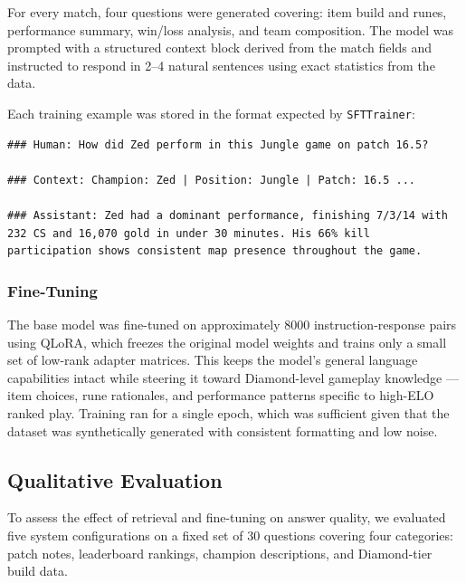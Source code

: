 \documentclass[fleqn,moreauthors,10pt]{ds_report}
\begin{document}
For every match, four questions were generated covering: item build and runes, performance summary, win/loss analysis, and team composition. The model was prompted with a structured context block derived from the match fields and instructed to respond in 2--4 natural sentences using exact statistics from the data.

Each training example was stored in the format expected by \texttt{SFTTrainer}:

\begin{lstlisting}
### Human: How did Zed perform in this Jungle game on patch 16.5?

### Context: Champion: Zed | Position: Jungle | Patch: 16.5 ...

### Assistant: Zed had a dominant performance, finishing 7/3/14 with
232 CS and 16,070 gold in under 30 minutes. His 66% kill
participation shows consistent map presence throughout the game.
\end{lstlisting}

\subsubsection*{Fine-Tuning}

The base model was fine-tuned on approximately 8000 instruction-response pairs using QLoRA,
which freezes the original model weights and trains only a small set of low-rank adapter
matrices. This keeps the model's general language capabilities intact while steering it
toward Diamond-level gameplay knowledge — item choices, rune rationales, and performance
patterns specific to high-ELO ranked play. Training ran for a single epoch, which was
sufficient given that the dataset was synthetically generated with consistent formatting
and low noise.


\subsection*{Qualitative Evaluation}

To assess the effect of retrieval and fine-tuning on answer quality, we evaluated five system configurations on a fixed set of 30 questions covering four categories: patch notes, leaderboard rankings, champion descriptions, and Diamond-tier build data.
\end{document}
